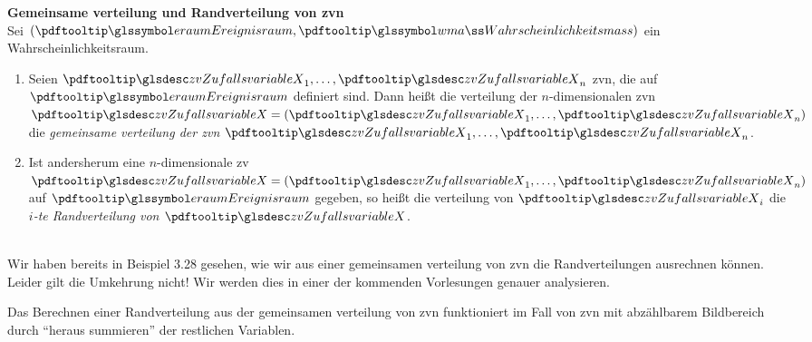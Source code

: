 \begin{defi}
    \textbf{Gemeinsame \gls{verteilung} und Randverteilung von \gls{zv}n}
      \\
    Sei $(\eraum, \pe)$ ein Wahrscheinlichkeitsraum.
    \begin{enumerate}[label=(\alph*)]
        \item Seien $\zvx_1, \dots, \zvx_n$ \gls{zv}n, die auf $\eraum$ definiert sind.
        Dann heißt
        die \gls{verteilung} der $n$-dimensionalen \gls{zv}n $\zvx = (\zvx_1, \dots, \zvx_n)$ die
        \emph{gemeinsame \gls{verteilung} der \gls{zv}n $\zvx_1, \dots, \zvx_n$}.
        \item Ist andersherum eine $n$-dimensionale \gls{zv} $\zvx = (\zvx_1, \dots, \zvx_n)$ auf
        $\eraum$ gegeben, so heißt die \gls{verteilung} von $\zvx_i$ die \emph{$i$-te Randverteilung von $\zvx$}.
    \end{enumerate}
\end{defi}

\begin{bem}[Warnung!]
      \\
    Wir haben bereits in Beispiel 3.28 gesehen, wie wir aus einer gemeinsamen \gls{verteilung} von
    \gls{zv}n die Randverteilungen ausrechnen können.
    Leider gilt die Umkehrung nicht!
    Wir
    werden dies in einer der kommenden Vorlesungen genauer analysieren.

    Das Berechnen einer Randverteilung aus der gemeinsamen \gls{verteilung} von \gls{zv}n
    funktioniert im Fall von \gls{zv}n mit abzählbarem Bildbereich durch
    ``heraus summieren'' der restlichen Variablen.
\end{bem}

